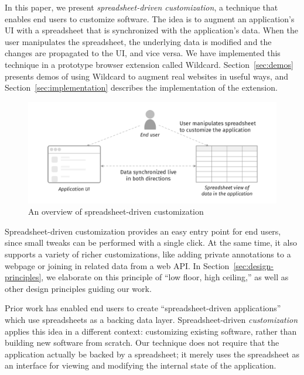 \documentclass[english,submission]{programming}
\begin{document}
In this paper, we present \emph{spreadsheet-driven customization}, a
technique that enables end users to customize software. The idea is to
augment an application's UI with a spreadsheet that is synchronized with
the application's data. When the user manipulates the spreadsheet, the
underlying data is modified and the changes are propagated to the UI,
and vice versa. We have implemented this technique in a prototype
browser extension called Wildcard. Section~\ref{sec:demos} presents
demos of using Wildcard to augment real websites in useful ways, and
Section~\ref{sec:implementation} describes the implementation of the
extension.

\begin{figure}
\hypertarget{fig:overview}{%
\centering
\includegraphics{media/overview-300dpi.png}
\caption{An overview of spreadsheet-driven
customization}\label{fig:overview}
}
\end{figure}

Spreadsheet-driven customization provides an easy entry point for end
users, since small tweaks can be performed with a single click. At the
same time, it also supports a variety of richer customizations, like
adding private annotations to a webpage or joining in related data from
a web API. In Section~\ref{sec:design-principles}, we elaborate on this
principle of ``low floor, high ceiling,'' as well as other design
principles guiding our work.

Prior work \autocite{mccutchen2016,benson2014,chang2014} has enabled end
users to create ``spreadsheet-driven applications'' which use
spreadsheets as a backing data layer. Spreadsheet-driven
\emph{customization} applies this idea in a different context:
customizing existing software, rather than building new software from
scratch. Our technique does not require that the application actually be
backed by a spreadsheet; it merely uses the spreadsheet as an interface
for viewing and modifying the internal state of the application.
\end{document}
